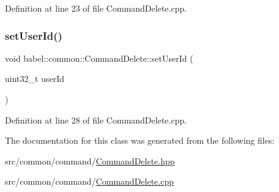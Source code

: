 Definition at line 23 of file Command\+Delete.\+cpp.

\mbox{\label{classbabel_1_1common_1_1_command_delete_a33910e3f5c699a26eac8fab5eb475350}} 
\subsubsection{\texorpdfstring{set\+User\+Id()}{setUserId()}}
{\footnotesize\ttfamily void babel\+::common\+::\+Command\+Delete\+::set\+User\+Id (\begin{DoxyParamCaption}\item[{uint32\+\_\+t}]{user\+Id }\end{DoxyParamCaption})}



Definition at line 28 of file Command\+Delete.\+cpp.



The documentation for this class was generated from the following files\+:\begin{DoxyCompactItemize}
\item 
src/common/command/\mbox{\hyperlink{_command_delete_8hpp}{Command\+Delete.\+hpp}}\item 
src/common/command/\mbox{\hyperlink{_command_delete_8cpp}{Command\+Delete.\+cpp}}\end{DoxyCompactItemize}

